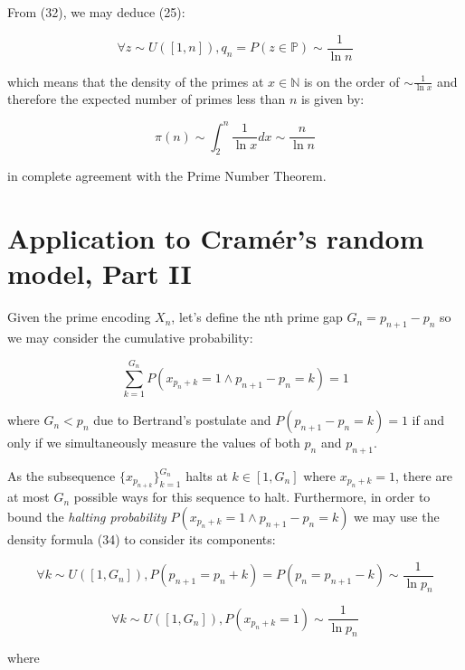 \documentclass{article}
\begin{document}
From (32), we may deduce (25):

\begin{equation}
\forall z \sim U([1,n]), q_n = P(z \in \mathbb{P}) \sim \frac{1}{\ln n}
\end{equation}

which means that the density of the primes at $x \in \mathbb{N}$ is on the order 
of $\sim \frac{1}{\ln x}$ and therefore the expected number of primes less than $n$ is given by: 

\begin{equation}
\pi(n) \sim \int_{2}^n \frac{1}{\ln x} dx \sim \frac{n}{\ln n}
\end{equation}

in complete agreement with the Prime Number Theorem. 

\newpage 

\section{Application to Cramér's random model, Part II}

Given the prime encoding $X_n$, let's define the nth prime gap $G_n=p_{n+1}-p_n$ so we may consider the cumulative probability:

\begin{equation}
\sum_{k=1}^{G_n} P(x_{p_n + k} = 1 \land p_{n+1}-p_n = k) = 1
\end{equation}

where $G_n < p_n$ due to Bertrand's postulate and $P(p_{n+1}-p_n=k) = 1$ if and only if we simultaneously measure the values of both $p_n$ and $p_{n+1}$.

As the subsequence $\{x_{p_{n+k}}\}_{k=1}^{G_n}$ halts at $k \in [1,G_n]$ where $x_{p_n+k}=1$, there are at most $G_n$ possible
ways for this sequence to halt. Furthermore, in order to bound the \textit{halting probability} $P(x_{p_n + k} = 1 \land p_{n+1}-p_n = k)$ we may use the density formula (34) to consider its components:

\begin{equation}
\forall k \sim U([1,G_n]), P(p_{n+1} = p_n + k) = P(p_n = p_{n+1} -k) \sim \frac{1}{\ln p_n}
\end{equation}

\begin{equation}
\forall k \sim U([1,G_n]),P(x_{p_n + k} = 1) \sim \frac{1}{\ln p_n}
\end{equation}

where
\end{document}
